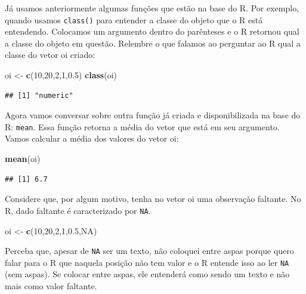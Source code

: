 \documentclass[
]{book}
\newenvironment{Shaded}{\begin{snugshade}}{\end{snugshade}}
\newcommand{\DecValTok}[1]{\textcolor[rgb]{0.00,0.00,0.81}{#1}}
\newcommand{\FloatTok}[1]{\textcolor[rgb]{0.00,0.00,0.81}{#1}}
\newcommand{\KeywordTok}[1]{\textcolor[rgb]{0.13,0.29,0.53}{\textbf{#1}}}
\newcommand{\NormalTok}[1]{#1}
\newcommand{\OtherTok}[1]{\textcolor[rgb]{0.56,0.35,0.01}{#1}}
\newcommand{\StringTok}[1]{\textcolor[rgb]{0.31,0.60,0.02}{#1}}
\begin{document}
Já usamos anteriormente algumas funções que estão na base do R. Por exemplo, quando usamos \texttt{class()} para entender a classe do objeto que o R está entendendo. Colocamos um argumento dentro do parênteses e o R retornou qual a classe do objeto em questão. Relembre o que falamos ao perguntar ao R qual a classe do vetor oi criado:

\begin{Shaded}
\begin{Highlighting}[]
\NormalTok{oi <-}\StringTok{ }\KeywordTok{c}\NormalTok{(}\DecValTok{10}\NormalTok{,}\DecValTok{20}\NormalTok{,}\DecValTok{2}\NormalTok{,}\DecValTok{1}\NormalTok{,}\FloatTok{0.5}\NormalTok{)}
\KeywordTok{class}\NormalTok{(oi)}
\end{Highlighting}
\end{Shaded}

\begin{verbatim}
## [1] "numeric"
\end{verbatim}

Agora vamos conversar sobre outra função já criada e disponibilizada na base do R: \texttt{mean}. Essa função retorna a média do vetor que está em seu argumento. Vamos calcular a média dos valores do vetor oi:

\begin{Shaded}
\begin{Highlighting}[]
\KeywordTok{mean}\NormalTok{(oi)}
\end{Highlighting}
\end{Shaded}

\begin{verbatim}
## [1] 6.7
\end{verbatim}

Considere que, por algum motivo, tenha no vetor oi uma observação faltante. No R, dado faltante é caracterizado por \texttt{NA}.

\begin{Shaded}
\begin{Highlighting}[]
\NormalTok{oi <-}\StringTok{ }\KeywordTok{c}\NormalTok{(}\DecValTok{10}\NormalTok{,}\DecValTok{20}\NormalTok{,}\DecValTok{2}\NormalTok{,}\DecValTok{1}\NormalTok{,}\FloatTok{0.5}\NormalTok{,}\OtherTok{NA}\NormalTok{)}
\end{Highlighting}
\end{Shaded}

Perceba que, apesar de \texttt{NA} ser um texto, não coloquei entre aspas porque quero falar para o R que naquela posição não tem valor e o R entende isso ao ler \texttt{NA} (sem aspas). Se colocar entre aspas, ele entenderá como sendo um texto e não mais como valor faltante.
\end{document}
